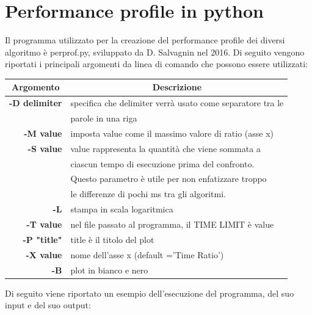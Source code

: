 \chapter{Performance profile in python}\label{perf_profile_py}
Il programma utilizzato per la creazione del performance profile dei diversi algoritmo è perprof.py, sviluppato da D. Salvagnin nel 2016. Di seguito vengono riportati i principali argomenti da linea di comando che possono essere utilizzati:\\
\begin{table}[H]
\centering
\begin{tabular}{rl}
\hline
\multicolumn{1}{c}{\textbf{Argomento}} & \multicolumn{1}{c}{\textbf{Descrizione}}\\
\hline
\textbf{-D delimiter} & {specifica che delimiter verrà usato come separatore tra le}\\
& {parole in una riga}\\
\textbf{-M value} & {imposta value come il massimo valore di ratio (asse x)}\\
\textbf{-S value} & {value rappresenta la quantità che viene sommata a}\\
& {ciascun tempo di esecuzione prima del confronto.}\\
& {Questo parametro è utile per non enfatizzare troppo}\\
& {le differenze di pochi ms tra gli algoritmi.}\\
\textbf{-L} & {stampa in scala logaritmica}\\
\textbf{-T value} & {nel file passato al programma, il TIME LIMIT è value}\\
\textbf{-P "title"} & {title è il titolo del plot}\\
\textbf{-X value} & {nome dell'asse x (default ='Time Ratio')}\\
\textbf{-B} & {plot in bianco e nero}\\
\hline
\end{tabular}
\end{table}
Di seguito viene riportato un esempio dell'esecuzione del programma, del suo input e del suo output:
